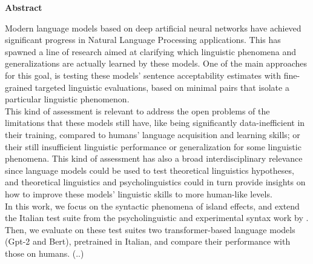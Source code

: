 \thispagestyle{plain}
\begin{center}
	\Large
	\vspace{1.8cm}
    \textbf{Abstract}
    	\vspace{0.9cm}
\end{center}

\normalsize
Modern language models based on deep artificial neural networks have achieved significant progress in Natural Language Processing applications. This has spawned a line of research aimed at clarifying which linguistic phenomena and generalizations are actually learned by these models. One of the main approaches for this goal, is testing these models' sentence acceptability estimates with fine-grained targeted linguistic evaluations, based on minimal pairs that isolate a particular linguistic phenomenon.\\

This kind of assessment is relevant to address the open problems of the limitations that these models still have, like being significantly data-inefficient in their training, compared to humans’ language acquisition and learning skills; or their still insufficient linguistic performance or generalization for some linguistic phenomena. This kind of assessment has also a broad interdisciplinary relevance since language models could be used to test theoretical linguistics hypotheses, and theoretical linguistics and psycholinguistics could in turn provide insights on how to improve these models' linguistic skills to more human-like levels.\\ 

In this work, we focus on the syntactic phenomena of island effects, and extend the Italian test suite from the psycholinguistic and experimental syntax work by \citet{sprouse2016experimental}. Then,  we evaluate on these test suites two transformer-based language models (Gpt-2 and Bert), pretrained in Italian, and compare their performance with those on humans. (..)%
